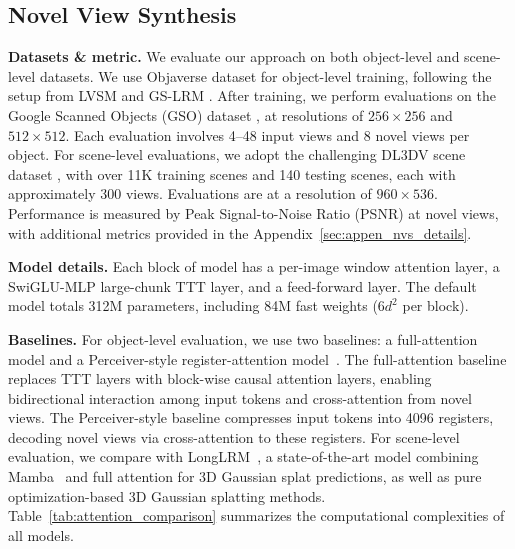 \subsection{Novel View Synthesis}\label{sec:exp_nvs}




\noindent\textbf{Datasets \& metric.} We evaluate our approach on 
both object-level and scene-level datasets.
We use Objaverse dataset \cite{deitke2023objaverse} for object-level training, 
following the setup from LVSM \cite{jin2024lvsm} and GS-LRM \cite{zhang2024gs}.  
After training, we perform evaluations on the Google Scanned Objects (GSO) dataset \cite{downs2022google}, at resolutions of $256\times256$ and $512\times512$. Each evaluation involves 4–48 input views and 8 novel views per object.
For scene-level evaluations, we adopt the challenging DL3DV scene dataset \cite{ling2024dl3dv}, with over 11K training scenes and 140 testing scenes, each with approximately 300 views.
Evaluations are at a resolution of $960\times536$.
Performance is measured by Peak Signal-to-Noise Ratio (PSNR) at novel views, with additional metrics provided in the Appendix~\ref{sec:appen_nvs_details}.

\noindent\textbf{Model details.}
Each block of model
has a per-image window attention layer,  a SwiGLU-MLP large-chunk TTT layer, 
and a feed-forward layer. 
The default model totals 312M parameters, including 84M fast weights ($6 d^2$ per block). 


\noindent\textbf{Baselines.}
For object-level evaluation, we use two baselines: a full-attention model and a Perceiver-style register-attention model~\cite{jaegle2021perceiver}. The full-attention baseline replaces TTT layers with block-wise causal attention layers, enabling bidirectional interaction among input tokens and cross-attention from novel views. The Perceiver-style baseline compresses input tokens into 4096 registers, decoding novel views via cross-attention to these registers.
For scene-level evaluation, we compare with LongLRM~\cite{ziwen2024long}, a state-of-the-art model combining Mamba~\cite{gu2023mamba} and full attention for 3D Gaussian splat predictions, as well as pure optimization-based 3D Gaussian splatting methods. Table~\ref{tab:attention_comparison} summarizes the computational complexities of all models.

